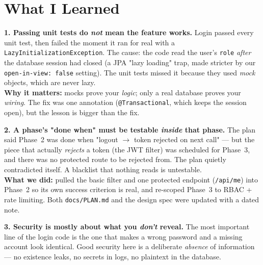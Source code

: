 \documentclass[11pt,a4paper]{article}
\newcommand{\code}[1]{\texttt{#1}}
\begin{document}
\section{What I Learned}

\begin{lessonbox}
\textbf{1. Passing unit tests do \emph{not} mean the feature works.}
Login passed every unit test, then failed the moment it ran for real with a
\code{LazyInitializationException}. The cause: the code read the user's \code{role} \emph{after} the
database session had closed (a JPA "lazy loading" trap, made stricter by our \code{open-in-view:
false} setting). The unit tests missed it because they used \emph{mock} objects, which are never
lazy. \\[4pt]
\textbf{Why it matters:} mocks prove your \emph{logic}; only a real database proves your
\emph{wiring}. The fix was one annotation (\code{@Transactional}, which keeps the session open), but
the lesson is bigger than the fix.
\end{lessonbox}

\begin{lessonbox}
\textbf{2. A phase's "done when" must be testable \emph{inside} that phase.}
The plan said Phase~2 was done when "logout $\rightarrow$ token rejected on next call" --- but the
piece that actually \emph{rejects} a token (the JWT filter) was scheduled for Phase~3, and there was
no protected route to be rejected from. The plan quietly contradicted itself. A blacklist that
nothing reads is untestable. \\[4pt]
\textbf{What we did:} pulled the basic filter and one protected endpoint (\code{/api/me}) into
Phase~2 so its own success criterion is real, and re-scoped Phase~3 to RBAC + rate limiting. Both
\code{docs/PLAN.md} and the design spec were updated with a dated note.
\end{lessonbox}

\begin{lessonbox}
\textbf{3. Security is mostly about what you \emph{don't} reveal.}
The most important line of the login code is the one that makes a wrong password and a missing
account look identical. Good security here is a deliberate \emph{absence} of information --- no
existence leaks, no secrets in logs, no plaintext in the database.
\end{lessonbox}

\end{document}
